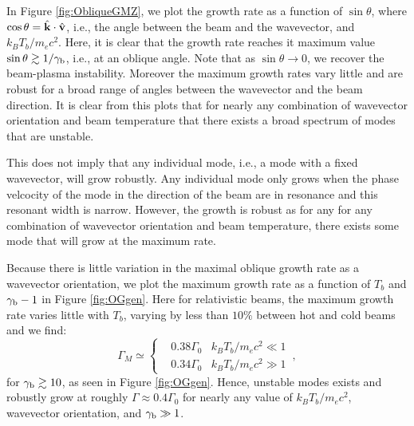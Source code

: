 \documentclass[usenatbib,iop,apj,numberedappendix]{aeb_emulateapj_2015}
\newcommand\bmath[1] {\mbox{\boldmath$\rm #1$}}
\newcommand{\vel}{\ensuremath{\bmath{v}}}
\newcommand{\kvec}{\ensuremath{\bmath{k}}}
\newcommand{\gammabeam}{\ensuremath{\gamma_{\rm b}}}
\begin{document}
In Figure \ref{fig:ObliqueGMZ}, we plot the growth rate as a function of
$\sin\theta$, where $\cos\theta = \hat{\kvec}\cdot\hat{\vel}$, i.e., the angle between the
beam and the wavevector, and $k_BT_b/m_e c^2$.  Here, it is clear that the growth
rate reaches it maximum value $\sin\theta \gtrsim1/\gammabeam$, i.e., at an oblique angle.  Note that as $\sin\theta \rightarrow 0$, we recover the beam-plasma instability.  Moreover the maximum growth rates vary little and are
robust for a broad range of angles between the wavevector and the beam direction.  It is clear from this plots that for nearly any combination of wavevector orientation and beam temperature that there exists a broad spectrum of modes that are unstable. 

This does not imply that any individual mode, i.e., a mode with a fixed wavevector, will grow robustly.  Any individual mode only grows when the phase velcocity of the mode in the direction of the beam are in resonance and this resonant width is narrow.  However, the growth is robust as for any for any combination of wavevector orientation and beam temperature, there exists some mode that will grow at the maximum rate. 

Because there is little variation in the maximal oblique growth rate as a wavevector orientation, we plot the maximum growth rate as a function of $T_b$
and $\gammabeam - 1$ in Figure \ref{fig:OGgen}.  Here for relativistic beams, the maximum growth rate varies
little with $T_b$, varying by less than $10\%$ between hot and cold beams and 
we find:
\begin{equation}
\Gamma_M
\simeq
\left\{
\begin{aligned}
& 0.38 \Gamma_0 & k_BT_b/m_ec^2\ll 1\\
& 0.34 \Gamma_0 & k_BT_b/m_ec^2\gg 1
\end{aligned}
\right.\,,
\end{equation}
for $\gammabeam\gtrsim10$, as seen in Figure \ref{fig:OGgen}.  Hence, unstable modes exists and robustly grow at roughly $\Gamma \approx 0.4\Gamma_0$ for nearly any value of $k_BT_b/m_ec^2$, wavevector orientation, and $\gammabeam \gg 1$. 
\end{document}
